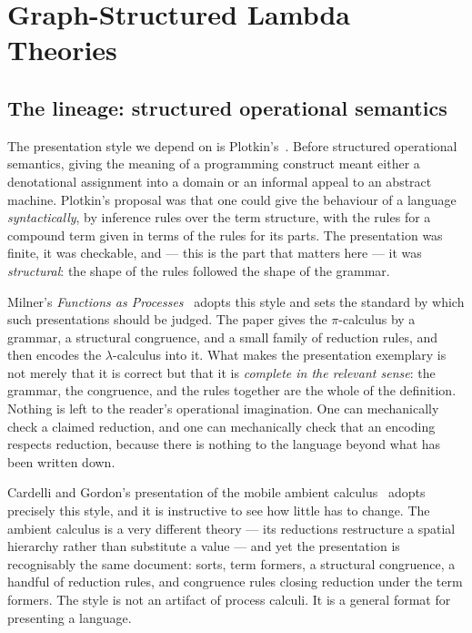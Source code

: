 \chapter{Graph-Structured Lambda Theories}
\label{ch:gslt}

\section{The lineage: structured operational semantics}

The presentation style we depend on is Plotkin's~\cite{Plotkin1981,Plotkin}. Before
structured operational semantics, giving the meaning of a programming construct meant
either a denotational assignment into a domain or an informal appeal to an abstract
machine. Plotkin's proposal was that one could give the behaviour of a language
\emph{syntactically}, by inference rules over the term structure, with the rules for a
compound term given in terms of the rules for its parts. The presentation was finite,
it was checkable, and --- this is the part that matters here --- it was
\emph{structural}: the shape of the rules followed the shape of the grammar.

Milner's \emph{Functions as Processes}~\cite{Milner1992} adopts this style and sets the
standard by which such presentations should be judged. The paper gives the
$\pi$-calculus by a grammar, a structural congruence, and a small family of reduction
rules, and then encodes the $\lambda$-calculus into it. What makes the presentation
exemplary is not merely that it is correct but that it is \emph{complete in the
relevant sense}: the grammar, the congruence, and the rules together are the whole of
the definition. Nothing is left to the reader's operational imagination. One can
mechanically check a claimed reduction, and one can mechanically check that an encoding
respects reduction, because there is nothing to the language beyond what has been
written down.

Cardelli and Gordon's presentation of the mobile ambient
calculus~\cite{CardelliGordon2000} adopts precisely this style, and it is instructive
to see how little has to change. The ambient calculus is a very different theory ---
its reductions restructure a spatial hierarchy rather than substitute a value --- and
yet the presentation is recognisably the same document: sorts, term formers, a
structural congruence, a handful of reduction rules, and congruence rules closing
reduction under the term formers. The style is not an artifact of process calculi. It
is a general format for presenting a language.

